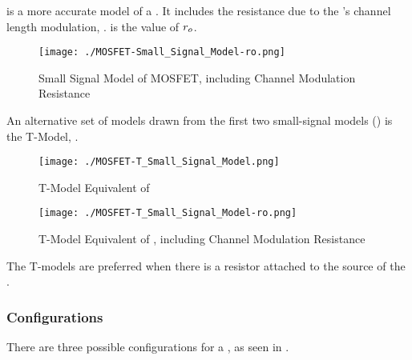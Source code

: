  is a more accurate model of a .
It includes the resistance due to the 's channel length modulation, .
 is the value of $r_{o}$.

\begin{figure}[h!tbp]
  \centering
  \texttt{[image: ./MOSFET-Small\_Signal\_Model-ro.png]}
  \caption{Small Signal Model of MOSFET, including Channel Modulation Resistance \parencite[p.~387]{sedraTextbook7}}
  \label{fig:MOSFET-Small_Signal_Model-ro}
\end{figure}

An alternative set of models drawn from the first two small-signal models () is the T-Model, .

\begin{figure}[h!tbp]
  \centering
  \texttt{[image: ./MOSFET-T\_Small\_Signal\_Model.png]}
  \caption{T-Model Equivalent of  \parencite[p.~394]{sedraTextbook7}}
  \label{fig:MOSFET-T_Small_Signal_Model}
\end{figure}

\begin{figure}[h!tbp]
  \centering
  \texttt{[image: ./MOSFET-T\_Small\_Signal\_Model-ro.png]}
  \caption{T-Model Equivalent of , including Channel Modulation Resistance \parencite[p.~395]{sedraTextbook7}}
  \label{fig:MOSFET-T_Small_Signal_Model-ro}
\end{figure}

\begin{remark*}
  The T-models are preferred when there is a resistor attached to the source of the .
\end{remark*}

\subsubsection{Configurations}\label{subsubsec:MOSFET_Configurations}
There are three possible configurations for a , as seen in .

